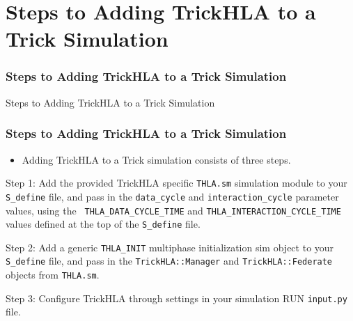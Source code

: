 \documentclass{beamer}
\newenvironment{hanging}
   { \par
     \vspace{0.2cm}
     \parskip 0.2cm
     \leftskip 1.5cm
     \parindent -0.75cm
     \par
   }
   { \par
     \leftskip 0.0cm
     \parindent 0.0cm
     \parskip 0.0cm
     \vspace{0.2cm}
   }
\begin{document}
   \section{Steps to Adding TrickHLA to a Trick Simulation}

   \begin{frame}
      \frametitle{Steps to Adding TrickHLA to a Trick Simulation}
      \begin{center}
      \Huge{Steps to Adding TrickHLA to a Trick Simulation}
      \end{center}
   \end{frame}
   
   \begin{frame}
      \frametitle{Steps to Adding TrickHLA to a Trick Simulation}
      \begin{itemize}
      \item Adding TrickHLA to a Trick simulation consists of three steps.
      \end{itemize}
      \begin{hanging}
      Step 1: Add the provided TrickHLA specific \texttt{THLA.sm} simulation
      module to your \texttt{S\_define} file, and pass in the \texttt{data\_cycle}
      and \texttt{interaction\_cycle} parameter values, using the \texttt{
      THLA\_DATA\_CYCLE\_TIME} and \texttt{THLA\_INTERACTION\_CYCLE\_TIME}
      values defined at the top of the \texttt{S\_define} file.
      
      Step 2: Add a generic \texttt{THLA\_INIT} multiphase initialization sim
      object to your \texttt{S\_define} file, and pass in the \texttt{TrickHLA::Manager}
      and \texttt{TrickHLA::Federate} objects from \texttt{THLA.sm}.
      
      Step 3: Configure TrickHLA through settings in your simulation RUN \texttt{input.py} file.
      \end{hanging}
      
   \end{frame}
   
\end{document}
